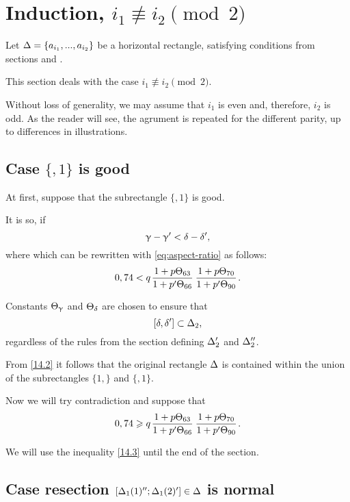 \section{Induction, $i_1 \not\equiv i_2 \pmod 2$}

Let $\Delta = \{ a_{i_1}, ..., a_{i_2}\}$ be a horizontal rectangle,
satisfying conditions from sections  and .

This section deals with the case $i_1 \not\equiv i_2 \pmod 2$.

Without loss of generality, we may assume that $i_1$ is even and, therefore, $i_2$ is odd.
As the reader will see, the agrument is repeated for the different parity,
up to differences in illustrations.

\subsection{Case $\{, 1\}$ is good}

At first, suppose that the subrectangle $\{,1\}$ is good.

It is so, if
\begin{equation*}
	\upgamma - \upgamma' < \delta - \delta',
\end{equation*}
where
which can be rewritten with \ref{eq:aspect-ratio} as follows:
\begin{equation}\label{14.2}
	0,74 < q \up{63}{66} \up{70}{90}.
\end{equation}

Constants $\Theta_{\upgamma}$ and $\Theta_{\delta}$ are chosen to ensure that
\begin{equation*}
	\left[ \delta, \delta' \right] \subset \Delta_2,
\end{equation*}
regardless of the rules from the section  defining $\Delta_2'$ and $\Delta_2''$.

From \ref{14.2} it follows that the original rectangle $\Delta$ is contained
within the union of the subrectangles $\{1,\}$ and $\{,1\}$.

Now we will try contradiction and suppose that
\begin{equation}\label{14.3}
	0,74 \geqslant q \up{63}{66} \up{70}{90}.
\end{equation}

We will use the inequality \ref{14.3} until the end of the section.


\subsection{Case resection $\left[ \Delta_1(1)''; \Delta_1(2)' \right] \in \Delta$ is normal}

